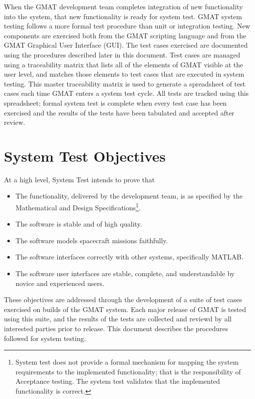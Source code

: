 When the GMAT development team completes integration of new functionality into the system, that new
functionality is ready for system test.  GMAT system testing follows a more formal test procedure
than unit or integration testing.  New components are exercised both from the GMAT scripting
language and from the GMAT Graphical User Interface (GUI).  The test cases exercised are documented
using the procedures described later in this document.  Test cases are managed using a traceability
matrix that lists all of the elements of GMAT visible at the user level, and matches those elements
to test cases that are executed in system testing.  This master traceability matrix is used to
generate a spreadsheet of test cases each time GMAT enters a system test cycle.  All tests are
tracked using this spreadsheet; formal system test is complete when every test case has been
exercised and the results of the tests have been tabulated and accepted after review.

\section{System Test Objectives}

At a high level, System Test intends to prove that

\begin{itemize}
\item The functionality, delivered by the development team, is as specified by the Mathematical and
Design Specifications\footnote{System test does not provide a formal mechanism for mapping the
system requirements to the implemented functionality; that is the responsibility of Acceptance
testing.  The system test validates that the implemented functionality is correct.}.
\item The software is stable and of high quality.
\item The software models spacecraft missions faithfully.
\item The software interfaces correctly with other systems, specifically MATLAB.
\item The software user interfaces are stable, complete, and understandable by novice and
experienced users.
\end{itemize}

These objectives are addressed through the development of a suite of test cases exercised on builds of the GMAT system.  Each major release of GMAT is tested using this suite, and the results of the
tests are collected and reviewd by all interested parties prior to release.  This document
describes the procedures followed for system testing.

